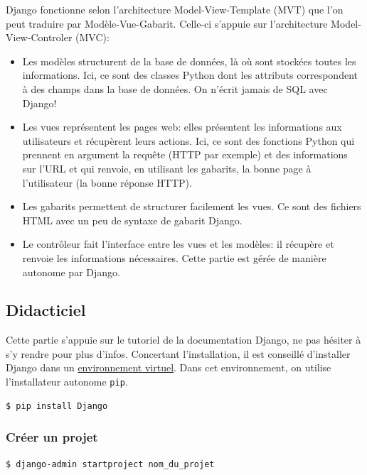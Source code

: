 \documentclass[a4paper, 10pt]{article}
\newcommand{\code}[1]{{\small\texttt{#1}}}
\begin{document}
Django fonctionne selon l'architecture Model-View-Template (MVT) que l'on peut traduire par Modèle-Vue-Gabarit. Celle-ci s’appuie sur l'architecture Model-View-Controler (MVC):
\begin{itemize}
	\item Les modèles structurent de la base de données, là où sont stockées toutes les informations. Ici, ce sont des classes Python dont les attributs correspondent à des champs dans la base de données. On n'écrit jamais de SQL avec Django!
	\item Les vues représentent les pages web: elles présentent les informations aux utilisateurs et récupèrent leurs actions. Ici, ce sont des fonctions Python qui prennent en argument la requête (HTTP par exemple) et des informations sur l’URL et qui renvoie, en utilisant les gabarits, la bonne page à l'utilisateur (la bonne réponse HTTP).
	\item Les gabarits permettent de structurer facilement les vues. Ce sont des fichiers HTML avec un peu de syntaxe de gabarit Django.
	\item Le contrôleur fait l'interface entre les vues et les modèles: il récupère et renvoie les informations nécessaires. Cette partie est gérée de manière autonome par Django.
\end{itemize}

\subsection{Didacticiel}
Cette partie s'appuie sur le tutoriel de la documentation Django, ne pas hésiter à s'y rendre pour plus d'infos. Concertant l'installation, il est conseillé d'installer Django dans un \hyperref[virtualenv]{environnement virtuel}. Dans cet environnement, on utilise l'installateur autonome \code{pip}.

\begin{verbatim}
$ pip install Django
\end{verbatim}

\subsubsection{Créer un projet}
\begin{verbatim}
$ django-admin startproject nom_du_projet
\end{verbatim}
\end{document}

